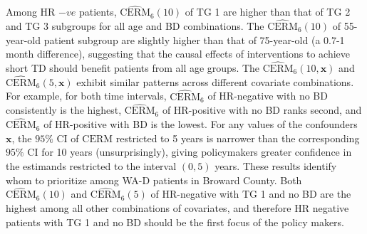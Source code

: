 \documentclass[aoas]{imsart}
\theoremstyle{plain}
\theoremstyle{definition}
\begin{document}
Among HR $-ve$ patients, 
$\widehat{\text{CERM}}_{6}(10)$ of TG 1 are higher than that of TG 2 and TG 3 subgroups for all age and BD combinations. The $\widehat{\text{CERM}}_{6}(10)$ of 55-year-old patient subgroup are slightly higher than that of 75-year-old  (a 0.7-1 month difference), suggesting that the causal effects of interventions to achieve short TD should benefit patients from all age groups.  The $\widehat{\text{CERM}}_6(10, \mathbf{x})$ and $\widehat{\text{CERM}}_6(5, \mathbf{x})$ exhibit similar patterns across different covariate combinations. For example, for both time intervals, $\widehat{\text{CERM}}_6$ of HR-negative with no BD consistently is the highest, $\widehat{\text{CERM}}_6$ of HR-positive with no BD ranks second, and $\widehat{\text{CERM}}_6$ of HR-positive with BD is the lowest. For any values of the confounders $\mathbf{x}$, the $95\%$ CI of ${\text{CERM}}$ restricted to 5 years is narrower than the corresponding $95\%$ CI for 10 years (unsurprisingly), giving policymakers greater confidence in the estimands restricted to the interval $(0,5)$ years.  These results identify whom to prioritize among WA-D patients in Broward County. Both $\widehat{\text{CERM}}_{6}(10)$ and $\widehat{\text{CERM}}_{6}(5)$ of HR-negative with TG 1 and no BD are the highest among all other combinations of covariates, and therefore HR negative patients with TG 1 and no BD should be the first focus of the policy makers.
\end{document}
